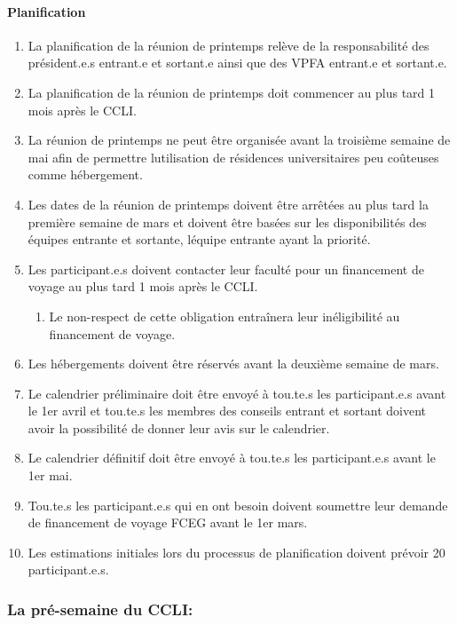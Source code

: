 \paragraph{Planification}
\begin{enumerate}
 \item
  La planification de la réunion de printemps relève de la responsabilité des président.e.s entrant.e et sortant.e ainsi que des VPFA entrant.e et sortant.e.
 \item
  La planification de la réunion de printemps doit commencer au plus tard 1 mois après le CCLI.
 \item
  La réunion de printemps ne peut être organisée avant la troisième semaine de mai afin de permettre l\textquotesingle utilisation de résidences universitaires peu coûteuses comme hébergement.
 \item
  Les dates de la réunion de printemps doivent être arrêtées au plus tard la première semaine de mars et doivent être basées sur les disponibilités des équipes entrante et sortante, l\textquotesingle équipe entrante ayant la priorité.
 \item
  Les participant.e.s doivent contacter leur faculté pour un financement de voyage au plus tard 1 mois après le CCLI.

  \begin{enumerate}
   \item
    Le non-respect de cette obligation entraînera leur inéligibilité au financement de voyage.
  \end{enumerate}

 \item
  Les hébergements doivent être réservés avant la deuxième semaine de mars.
 \item
  Le calendrier préliminaire doit être envoyé à tou.te.s les participant.e.s avant le 1er avril et tou.te.s les membres des conseils entrant et sortant doivent avoir la possibilité de donner leur avis sur le calendrier.
 \item
  Le calendrier définitif doit être envoyé à tou.te.s les participant.e.s avant le 1er mai.
 \item
  Tou.te.s les participant.e.s qui en ont besoin doivent soumettre leur demande de financement de voyage FCEG avant le 1er mars.
 \item
  Les estimations initiales lors du processus de planification doivent prévoir 20 participant.e.s.
\end{enumerate}

\subsubsection{La pré-semaine du CCLI:}
\label{la-pre-semaine-du-ccli}

